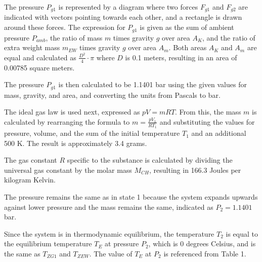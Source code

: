 The pressure \( P_{g1} \) is represented by a diagram where two forces \( F_{g1} \) and \( F_{g2} \) are indicated with vectors pointing towards each other, and a rectangle is drawn around these forces. The expression for \( P_{g1} \) is given as the sum of ambient pressure \( P_{amb} \), the ratio of mass \( m \) times gravity \( g \) over area \( A_K \), and the ratio of extra weight mass \( m_{EW} \) times gravity \( g \) over area \( A_m \). Both areas \( A_K \) and \( A_m \) are equal and calculated as \( \frac{D^2}{4} \cdot \pi \) where \( D \) is 0.1 meters, resulting in an area of 0.00785 square meters.

The pressure \( P_{g1} \) is then calculated to be 1.1401 bar using the given values for mass, gravity, and area, and converting the units from Pascals to bar.

The ideal gas law is used next, expressed as \( pV = mRT \). From this, the mass \( m \) is calculated by rearranging the formula to \( m = \frac{pV_1}{RT_1} \) and substituting the values for pressure, volume, and the sum of the initial temperature \( T_1 \) and an additional 500 K. The result is approximately 3.4 grams.

The gas constant \( R \) specific to the substance is calculated by dividing the universal gas constant by the molar mass \( M_{CH} \), resulting in 166.3 Joules per kilogram Kelvin.

The pressure remains the same as in state 1 because the system expands upwards against lower pressure and the mass remains the same, indicated as \( P_2 = 1.1401 \) bar.

Since the system is in thermodynamic equilibrium, the temperature \( T_2 \) is equal to the equilibrium temperature \( T_E \) at pressure \( P_2 \), which is 0 degrees Celsius, and is the same as \( T_{ZG1} \) and \( T_{ZEW} \). The value of \( T_E \) at \( P_2 \) is referenced from Table 1.